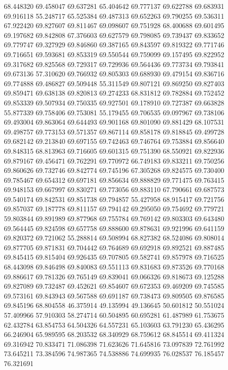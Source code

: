 68.448320
69.458047
69.637281
65.404642
69.777137
69.622788
69.683931
69.916118
55.248717
65.525384
69.487313
69.652263
69.790255
69.536311
67.922420
69.827607
69.811467
69.098607
69.751928
68.400688
69.601495
69.197682
69.842808
67.376603
69.627579
69.798085
69.739437
69.833652
69.779747
69.327929
69.846860
69.387165
69.843597
69.819322
69.771746
69.716651
69.593681
69.853319
69.550544
69.759099
69.157495
69.822952
69.317682
69.825568
69.729317
69.729936
69.564436
69.773734
69.793841
69.673136
57.310620
69.766932
69.805303
69.688930
69.479154
69.836716
69.774888
69.486827
69.509448
55.311549
69.807121
69.869250
69.827403
69.859471
69.638138
69.820813
69.274233
68.831812
69.782884
69.752452
69.853339
69.507934
69.750335
69.927501
69.178910
69.727387
69.663828
55.877339
69.758406
69.753081
55.179455
69.706535
69.097967
69.738106
69.493004
69.863064
69.644493
69.901168
69.801090
69.881429
68.107531
69.498757
69.773153
69.571357
69.867114
69.858178
69.818845
69.499728
69.682142
69.213840
69.697155
69.742463
69.746764
69.753884
69.856640
69.848315
68.813963
69.716605
69.601315
69.751390
68.550921
69.822936
69.879167
69.456471
69.762291
69.770972
66.749183
69.833211
69.750256
69.860626
69.732746
69.842774
69.745196
67.305268
69.824575
69.730400
69.785467
69.654312
69.697181
69.856634
69.888829
69.771475
69.763415
69.948153
69.667997
69.830271
69.773056
69.883110
67.790661
69.687573
69.540174
69.842531
69.851738
69.794857
55.427958
68.915417
69.721756
69.857037
69.187778
69.811157
69.794142
69.295050
69.754692
69.779721
59.803844
69.891989
69.877968
69.755784
69.769142
69.803303
69.643480
69.564445
69.824598
69.657758
69.888600
69.878631
69.921996
69.641159
69.820372
69.721062
55.288814
69.508994
68.827382
68.524086
69.808014
69.877705
69.871831
69.704442
69.764689
69.692918
69.892521
69.887485
69.845415
69.815404
69.926435
69.707805
69.582741
69.857978
69.716525
68.443098
69.846498
69.840083
69.551113
69.831683
69.873526
69.770168
69.886617
69.781326
69.765149
69.839041
69.066326
69.818673
69.125288
69.827089
69.732487
69.452621
69.854607
69.672353
69.469209
69.745585
69.573161
69.843943
69.567588
69.691187
69.738473
69.809505
69.876585
69.845196
68.804558
46.375914
49.135994
49.136645
50.601812
50.551024
57.409966
57.910303
58.274714
60.504895
60.695281
61.487989
61.753675
62.432784
63.854753
64.504326
64.557231
65.103603
63.791230
65.436295
66.246904
65.989595
68.203532
68.340929
68.759612
68.845514
69.411324
69.316942
70.833471
71.086398
71.623626
71.645816
73.097839
72.761992
73.645211
73.384596
74.987365
74.538886
74.699935
76.028537
76.185457
76.321691
